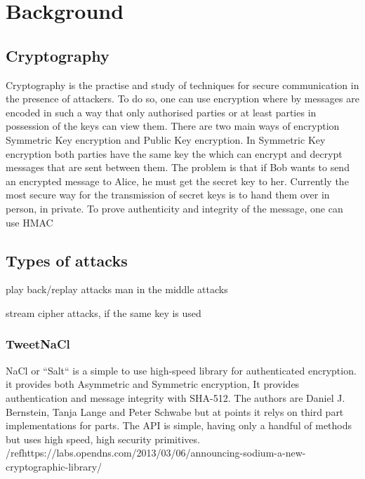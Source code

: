 
\chapter{Background}
\label{back}


\section{Cryptography}

Cryptography is the practise and study of techniques for secure communication in the presence of attackers. To do so, one can use encryption where by messages are encoded in such a way that only authorised parties or at least parties in possession of the keys can view them. There are two main ways of encryption Symmetric Key encryption and Public Key encryption. In Symmetric Key encryption both parties have the same key the which can encrypt and decrypt messages that are sent between them. The problem is that if Bob wants to send an encrypted message to Alice, he must get the secret key to her. Currently the most secure way for the transmission of secret keys is to hand them over in person, in private. To prove authenticity and integrity of the message, one can use HMAC

\section{Types of attacks}
play back/replay attacks
man in the middle attacks

stream cipher attacks, if the same key is used

\subsection{TweetNaCl}

NaCl or ``Salt`` is a simple to use high-speed library for authenticated encryption. it provides both Asymmetric and Symmetric encryption, It provides authentication and message integrity with SHA-512. The authors are Daniel J. Bernstein, Tanja Lange and Peter Schwabe but at points it relys on third part implementations for parts. The API is simple, having only a handful of methods but uses high speed, high security primitives.
/ref{https://labs.opendns.com/2013/03/06/announcing-sodium-a-new-cryptographic-library/}

